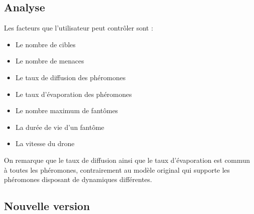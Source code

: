 \documentclass[12pt]{article}
\begin{document}
\subsection{Analyse}

Les facteurs que l'utilisateur peut contrôler sont :

\begin{itemize}
\item{Le nombre de cibles}
\item{Le nombre de menaces}
\item{Le taux de diffusion des phéromones}
\item{Le taux d'évaporation des phéromones}
\item{Le nombre maximum de fantômes}
\item{La durée de vie d'un fantôme}
\item{La vitesse du drone}
\end{itemize}

On remarque que le taux de diffusion ainsi que le taux d'évaporation
est commun à toutes les phéromones, contrairement au modèle original
qui supporte les phéromones disposant de dynamiques différentes.

\subsection{Nouvelle version}





\end{document}
